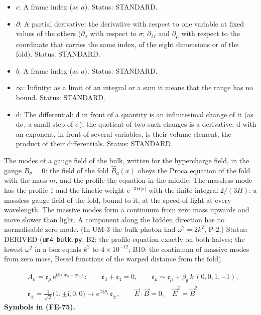 \documentclass[
  10pt,
]{article}
\begin{document}
\begin{itemize}
  \(\eta_{ab}\): The flat metric of the frame,
  \(\eta = \mathrm{diag}(1, 1, 1, 1, -1, -1, -1, -1)\) (eta4488 of
  4+4.nb); \(\eta^{ab}\) is its inverse (the same matrix). Unit:
  dimensionless. Status: AUTHOR.
\item
  \(c\): A frame index (as \(a\)). Status: STANDARD.
\item
  \(\partial\): A partial derivative: the derivative with respect to one
  variable at fixed values of the others (\(\partial_\sigma\) with
  respect to \(\sigma\); \(\partial_M\) and \(\partial_\mu\) with
  respect to the coordinate that carries the same index, of the eight
  dimensions or of the fold). Status: STANDARD.
\item
  \(b\): A frame index (as \(a\)). Status: STANDARD.
\item
  \(\infty\): Infinity: as a limit of an integral or a sum it means that
  the range has no bound. Status: STANDARD.
\item
  \(\mathrm{d}\): The differential: \(\mathrm{d}\) in front of a
  quantity is an infinitesimal change of it (as \(\mathrm{d}\sigma\), a
  small step of \(\sigma\)); the quotient of two such changes is a
  derivative; \(\mathrm{d}\) with an exponent, in front of several
  variables, is their volume element, the product of their
  differentials. Status: STANDARD.
\end{itemize}

The modes of a gauge field of the bulk, written for the hypercharge
field, in the gauge \(B_\sigma = 0\): the field of the fold
\(\hat B_a(x)\) obeys the Proca equation of the fold with the mass
\(m\), and the profile the equation in the middle. The massless mode has
the profile 1 and the kinetic weight
\(\mathrm{e}^{-3H\lvert\sigma\rvert}\) with the finite integral
\(2/(3H)\): a massless gauge field of the fold, bound to it, at the
speed of light at every wavelength. The massive modes form a continuum
from zero mass upwards and move slower than light. A component along the
hidden direction has no normalisable zero mode. (In UM-3 the bulk photon
had \(\omega^2 = 2k^2\), P-2.) Status: DERIVED (\texttt{um4\_bulk.py},
B2: the profile equation exactly on both halves; the lowest \(\omega^2\)
in a box equals \(k^2\) to \(4\times10^{-12}\); B10: the continuum of
massive modes from zero mass, Bessel functions of the warped distance
from the fold).

\[
\begin{aligned}
&A_\mu = \mathfrak{e}_\mu\,\mathrm{e}^{\mathrm{i}k(x_3 - x_4)}:\qquad \mathfrak{e}_3 + \mathfrak{e}_4 = 0,\qquad
\mathfrak{e}_\mu \sim \mathfrak{e}_\mu + \beta_{\mathrm{g}}\,k\,(0, 0, 1, -1),\\
&\mathfrak{e}_\pm = \frac{1}{\sqrt2}\big(1, \pm\mathrm{i}, 0, 0\big) \to \mathrm{e}^{\mp\mathrm{i}\theta_{\mathrm{r}}}\,\mathfrak{e}_\pm,\qquad
\vec E\cdot\vec B = 0,\quad \vec E^2 = \vec B^2
\end{aligned} \tag{FE-75}
\] \textbf{Symbols in (FE-75).}
\end{document}
